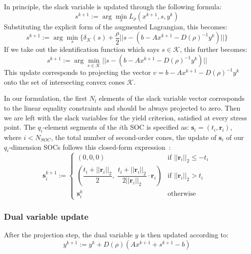 In principle, the slack variable is updated through the following formula:
\begin{equation}
s^{k+1} := \arg\min_{s} L_\rho(x^{k+1},s,y^k)
\end{equation} Substituting the explicit form of the augmented Lagrangian, this becomes:
\begin{equation}
s^{k+1} := \arg\min_{s} \{ \delta_\mathcal{K}(s)+\frac{\rho}{2}||s -  (b - Ax^{k+1} - D(\rho)^{-1}y^k)|| \}
\end{equation} If we take out the identification function which says $s\in\mathcal{K}$, this further becomes:
\begin{equation}
s^{k+1} := \arg\min_{s\in\mathcal{K}} ||s - (b - Ax^{k+1} - D(\rho)^{-1}y^k)||
\end{equation} This update corresponds to projecting the vector $v = b - Ax^{k+1} - D(\rho)^{-1} y^k$ onto the set of intersecting convex cones $\mathcal{K}$. 

In our formulation, the first $N_l$ elements of the slack variable vector corresponds to the linear equality constraints and should be always projected to zero. Then we are left with the slack variables for the yield criterion, satisfied at every stress point. The $q_i$-element segments of the $i$th SOC is specified as: $\boldsymbol{s}_i = (t_i, \boldsymbol{r}_i)$, where $i < N_{SOC}$, the total number of second-order cones, the update of $\boldsymbol{s}_i$ of our $q_i$-dimension SOCs follows this closed-form expression~\cite{COSMO}:
\begin{equation}
\boldsymbol{s}_i^{k+1} :=
\begin{cases}
(0, 0, 0) & \text{if } || \boldsymbol{r}_i ||_2 \le -t_i \\
\left( \dfrac{ t_i + ||\boldsymbol{r}_i||_2}{2},\; \dfrac{t_i + || \boldsymbol{r}_i ||_2}{2 ||\boldsymbol{r}_i ||_2} \cdot \boldsymbol{r}_i \right) & \text{if } ||\boldsymbol{r}_i||_2 > t_i \\
\boldsymbol{s}_i^k & \text{otherwise}
\end{cases}
\label{eq:2DProjection}
\end{equation}
\subsubsection{Dual variable update}

After the projection step, the dual variable $y$ is then updated according to:
\begin{equation}
y^{k+1} := y^k + D(\rho) (Ax^{k+1}+s^{k+1}-b)
\end{equation}
